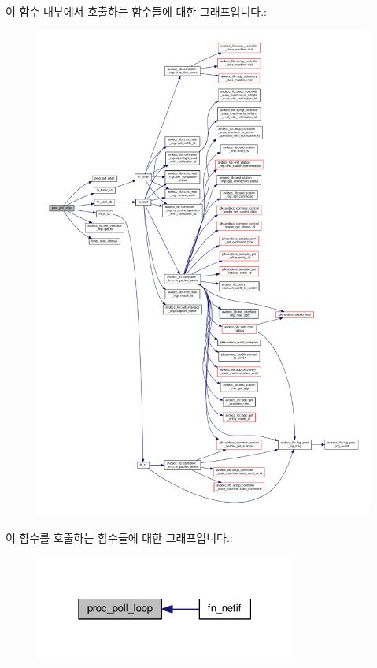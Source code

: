 이 함수 내부에서 호출하는 함수들에 대한 그래프입니다.\+:
\nopagebreak
\begin{figure}[H]
\begin{center}
\leavevmode
\includegraphics[width=350pt]{classavdecc__lib_1_1system__layer2__multithreaded__callback_a09e472b0088f22960c0441c5245097b8_cgraph}
\end{center}
\end{figure}




이 함수를 호출하는 함수들에 대한 그래프입니다.\+:
\nopagebreak
\begin{figure}[H]
\begin{center}
\leavevmode
\includegraphics[width=244pt]{classavdecc__lib_1_1system__layer2__multithreaded__callback_a09e472b0088f22960c0441c5245097b8_icgraph}
\end{center}
\end{figure}


